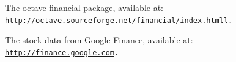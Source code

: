 \documentclass[11pt]{article}
\begin{document}
\begin{thebibliography}{9}

 The octave financial package, available at:
\\{\tt \url{http://octave.sourceforge.net/financial/index.htmll}.}

 The stock data from Google Finance, available at:
\\{\tt \url{http://finance.google.com}.}

\end{thebibliography}
 
\end{document}
